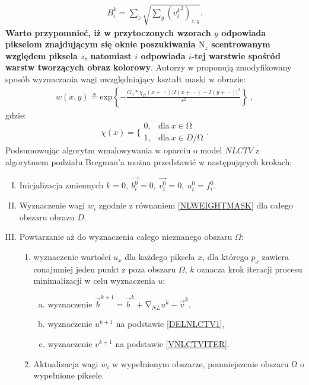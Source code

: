 \documentclass[a4paper,12pt,twoside,openany]{report}
\begin{document}
\begin{align}
B^k_i=\sum_z{\sqrt{\sum_y{\left({v^k_i}^2\right)_{z,y}}}}.
\end{align}
\textbf{Warto przypomnieć, iż w przytoczonych wzorach $y$ odpowiada pikselom znajdującym się oknie poszukiwania ${\mathrm{N}}_z$ scentrowanym względem piksela $z$, natomiast $i$ odpowiada $i$-tej warstwie spośród warstw tworzących obraz kolorowy}. Autorzy w \cite{jung2011nonlocal} proponują zmodyfikowany sposób wyznaczania wagi uwzględniający kształt maski w obrazie:
\begin{align}
w\left(x,y\right)\triangleq {\mathrm{exp} \left\{-\frac{G_{\sigma }*{\chi }_R\left(x+\ \cdot \right){\left|I\left(x+\ \cdot \right)-I\left(y+\ \cdot \right)\right|}^2}{r^2}\right\}\ },
\label{NLWEIGHTMASK}
\end{align}
gdzie:
\begin{equation}
{\chi }\left(x\right)=\Bigg\{ \begin{array}{ll}
0, & \text{dla} \ x \in  \mathrm{\Omega} \\ 
1, & \text{dla} \ x \in  D/\mathrm{\Omega} \end{array}
.
\end{equation}
Podsumowując algorytm wmalowywania w oparciu o model $NLCTV$ z algorytmem podziału Bregman’a można przedstawić w następujących krokach:
\begin{enumerate}[I.]
\item  
Inicjalizacja zmiennych $k=0,\ \overrightarrow{b^0_i}=0,\ \overrightarrow{v^0_i}=0,\ u^0_i=f^0_i$.
\item  
Wyznaczenie wagi $w_i$ zgodnie z równaniem \eqref{NLWEIGHTMASK} dla całego obszaru obrazu $D$.
\item  
Powtarzanie aż do wyznaczenia całego nieznanego obszaru $\Omega$:
\begin{enumerate}[1)]
\item
wyznaczenie wartości $u_x$ dla każdego piksela $x$, dla którego $p_x$ zawiera conajmniej jeden punkt z poza obszaru $\Omega$, $k$ oznacza krok iteracji procesu minimalizacji w celu wyznaczenia $u$:
\begin{enumerate}[a)]
\item
\noindent wyznaczenie ${\overrightarrow{b}}^{k+1}={\overrightarrow{b}}^k+{\mathrm{\nabla }}_{NL}u^k-{\overrightarrow{v}}^k$,
\item
\noindent wyznaczenie $u^{k+1}$ na podstawie \eqref{DELNLCTV1},
\item
\noindent wyznaczenie $v^{k+1}$ na podstawie \eqref{VNLCTVITER}.
\end{enumerate}
\item  
Aktualizacja wagi $w_i$ w wypełnionym obszarze, pomniejszenie obszaru $\mathrm{\Omega }$ o wypełnione piksele.
\end{enumerate}
\end{enumerate}
\end{document}
